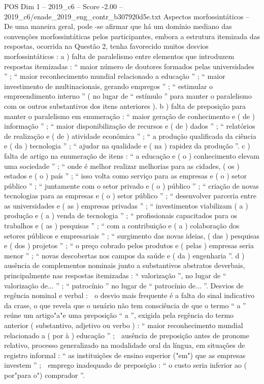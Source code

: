 \begin{textsample}{POS Dim 1 – 2019\_c6 – Score -2.00 – 2019\_c6/enade\_2019\_eng\_contr\_b307920d5e.txt}
Aspectos morfossintáticos – De uma maneira geral, pode -se afirmar que há um domínio mediano das convenções morfossintáticas pelos participantes, embora a estrutura itemizada das respostas, ocorrida na Questão 2, tenha favorecido muitos desvios morfossintáticos : a ) falta de paralelismo entre elementos que introduzem respostas itemizadas : “ maior número de doutores formados pelas universidades ” ; “ maior reconhecimento mundial relacionado a educação ” ; “ maior investimento de multinacionais, gerando empregos ” ; “ estimular o empreendimento interno ” ( no lugar de “ estímulo ” para manter o paralelismo com os outros substantivos dos itens anteriores ). b ) falta de preposição para manter o paralelismo em enumeração : “ maior geração de conhecimento e ( de ) informação ” ; “ maior disponibilização de recursos e ( de ) dados ” ; “ relatórios de realização e ( de ) atividade econômica ” ; “ a produção qualificada da ciência e ( da ) tecnologia ” ; “ ajudar na qualidade e ( na ) rapidez da produção ”. c ) falta de artigo na enumeração de itens : “ a educação e ( o ) conhecimento elevam uma sociedade ” ; “ onde é melhor realizar melhorias para as cidades, ( os ) estados e ( o ) país ” ; “ isso volta como serviço para as empresas e ( o ) setor público ” ; “ juntamente com o setor privado e ( o ) público ” ; “ criação de novas tecnologias para as empresas e ( o ) setor público ” ; “ desenvolver parceria entre as universidades e ( as ) empresas privadas ” ; “ investimentos viabilizam ( a ) produção e ( a ) venda de tecnologia ” ; “ profissionais capacitados para os trabalhos e ( as ) pesquisas ” ; “ com a contribuição e ( a ) colaboração dos setores públicos e empresariais ” ; “ surgimento das novas ideias, ( das ) pesquisas e ( dos ) projetos ” ; “ o preço cobrado pelos produtos e ( pelas ) empresas seria menor ” ; “ novas descobertas nos campos da saúde e ( da ) engenharia ”. d ) ausência de complementos nominais junto a substantivos abstratos deverbais, principalmente nas respostas itemizadas : “ valorização ”, no lugar de “ valorização de... ” ; “ patrocínio ” no lugar de “ patrocínio de... ”.
Desvios de regência nominal e verbal :  o desvio mais frequente é a falta do sinal indicativo da crase, o que revela que o usuário não tem consciência de que o termo “ a ” reúne um artigo"a"e uma preposição “ a ”, exigida pela regência do termo anterior ( substantivo, adjetivo ou verbo ) : “ maior reconhecimento mundial relacionado a ( por à ) educação ” ;  ausência de preposição antes de pronome relativo, processo generalizado na modalidade oral da língua, em situações de registro informal : “ as instituições de ensino superior ("em") que as empresas investem ” ;  emprego inadequado de preposição : “ o custo seria inferior ao ( por"para o") comprador ”.

\end{textsample}

